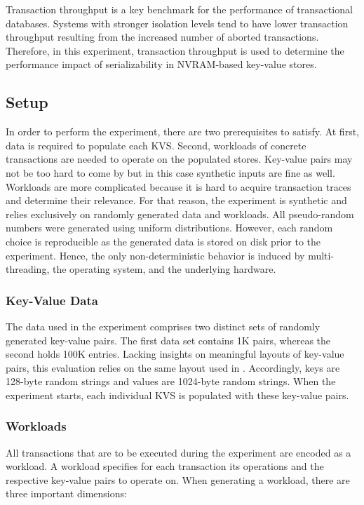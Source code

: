 Transaction throughput is a key benchmark for the performance of transactional
databases. Systems with stronger isolation levels tend to have lower transaction
throughput resulting from the increased number of aborted transactions.
Therefore, in this experiment, transaction throughput is used to determine the
performance impact of serializability in NVRAM-based key-value stores.

\subsection{Setup}

In order to perform the experiment, there are two prerequisites to satisfy. At
first, data is required to populate each \ac{KVS}. Second, workloads of concrete
transactions are needed to operate on the populated stores. Key-value pairs may
not be too hard to come by but in this case synthetic inputs are fine as well.
Workloads are more complicated because it is hard to acquire transaction traces
and determine their relevance. For that reason, the experiment is synthetic and
relies exclusively on randomly generated data and workloads. All pseudo-random
numbers were generated using uniform distributions. However, each random choice
is reproducible as the generated data is stored on disk prior to the experiment.
Hence, the only non-deterministic behavior is induced by multi-threading, the
operating system, and the underlying hardware.

\subsubsection{Key-Value Data}

The data used in the experiment comprises two distinct sets of randomly
generated key-value pairs. The first data set contains 1K pairs, whereas the
second holds 100K entries. Lacking insights on meaningful layouts of key-value
pairs, this evaluation relies on the same layout used in
\cite{bailey2013exploring}. Accordingly, keys are 128-byte random strings and
values are 1024-byte random strings. When the experiment starts, each individual
\ac{KVS} is populated with these key-value pairs.

\subsubsection{Workloads}

All transactions that are to be executed during the experiment are encoded as a
workload. A workload specifies for each transaction its operations and the
respective key-value pairs to operate on. When generating a workload, there are
three important dimensions:

